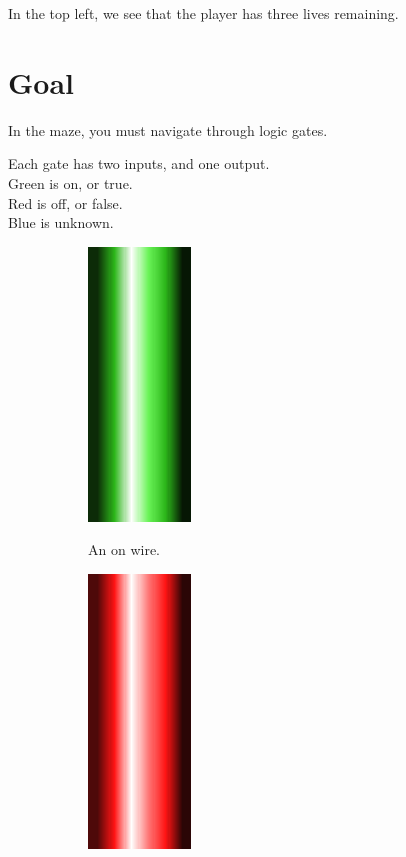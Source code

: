\documentclass[12pt]{book}
\begin{document}
			In the top left, we see that the player has three lives remaining.
		\section{Goal}
			In the maze, you must navigate through logic gates.

			Each gate has two inputs, and one output.
			\\
			\textcolor{on}{Green is on, or true.}
			\\
			\textcolor{off}{Red is off, or false.}
			\\
			\textcolor{unknown}{Blue is unknown.}

			\begin{figure}[h]
				\centering
				\begin{subfigure}[t]{0.3\textwidth}
					\centering
					\includegraphics[width=0.3\textwidth]{ON}

					An on wire.
				\end{subfigure}
				\hspace{1mm}
				\begin{subfigure}[t]{0.3\textwidth}
					\centering
					\includegraphics[width=0.3\textwidth]{OFF}


\end{subfigure}
\end{figure}
\end{document}
